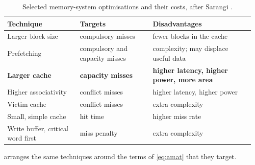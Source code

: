 \begin{table}[htbp]
  \centering
  \caption[Selected memory-system optimisations and their costs, after Sarangi]{Selected memory-system optimisations and their costs, after Sarangi \cite[Table~11.2]{sarangi2025basic}.}
  \label{tab:cache-optimisations}
  \small
  \begin{tabularx}{\textwidth}{@{}>{\raggedright\arraybackslash}p{4.3cm}>{\raggedright\arraybackslash}p{4.2cm}>{\raggedright\arraybackslash}X@{}}
    \toprule
    \textbf{Technique} & \textbf{Targets} & \textbf{Disadvantages} \\
    \midrule
    Larger block size & compulsory misses & fewer blocks in the cache \\
    Prefetching & compulsory and capacity misses & complexity; may displace useful data \\
    \textbf{Larger cache} & \textbf{capacity misses} & \textbf{higher latency, higher power, more area} \\
    Higher associativity & conflict misses & higher latency, higher power \\
    Victim cache & conflict misses & extra complexity \\
    Small, simple cache & hit time & higher miss rate \\
    Write buffer, critical word first & miss penalty & extra complexity \\
    \bottomrule
  \end{tabularx}
\end{table}

 arranges the same techniques around the terms of \cref{eq:amat} that they target.

